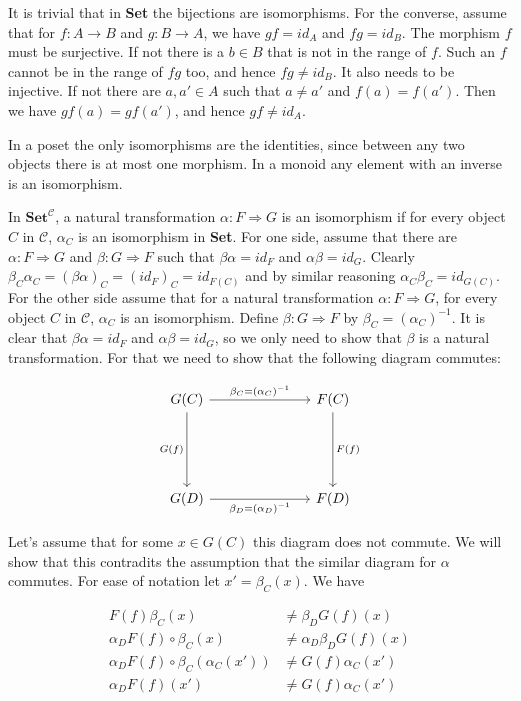 It is trivial that in \textbf{Set} the bijections are isomorphisms. For the converse, assume that for $f:A\to B$ and $g:B\to A$, we have $gf=id_A$ and $fg=id_B$. The morphism $f$ must be surjective. If not there is a $b\in B$ that is not in the range of $f$. Such an $f$ cannot be in the range of $fg$ too, and hence $fg\neq id_B$. It also needs to be injective. If not there are $a,a'\in A$ such that $a\neq a'$ and $f(a)=f(a')$. Then we have $gf(a)=gf(a')$, and hence $gf\neq id_A$.

In a poset the only isomorphisms are the identities, since between any two objects there is at most one morphism. In a monoid any element with an inverse is an isomorphism.

In $\textbf{Set}^\mathcal{C}$, a natural transformation $\alpha:F\Rightarrow G$ is an isomorphism if for every object $C$ in $\mathcal{C}$, $\alpha_C$ is an isomorphism in \textbf{Set}. For one side, assume that there are $\alpha:F\Rightarrow G$ and $\beta:G\Rightarrow F$ such that $\beta\alpha=id_F$ and $\alpha\beta=id_G$. Clearly $\beta_C\alpha_C=(\beta\alpha)_C=(id_F)_C=id_{F(C)}$ and by similar reasoning $\alpha_C\beta_C=id_{G(C)}$. For the other side assume that for a natural transformation $\alpha:F\Rightarrow G$, for every object $C$ in $\mathcal{C}$, $\alpha_C$ is an isomorphism. Define $\beta:G\Rightarrow F$ by $\beta_C=(\alpha_C)^{-1}$. It is clear that $\beta\alpha=id_F$ and $\alpha\beta=id_G$, so we only need to show that $\beta$ is a natural transformation.
For that we need to show that the following diagram commutes:

\[\begin{tikzcd}
	{G(C)} &&& {F(C)} \\
	\\
	\\
	{G(D)} &&& {F(D)}
	\arrow["{\beta_C=(\alpha_C)^{-1}}", from=1-1, to=1-4]
	\arrow["{F(f)}", from=1-4, to=4-4]
	\arrow["{G(f)}"', from=1-1, to=4-1]
	\arrow["{\beta_D=(\alpha_D)^{-1}}"', from=4-1, to=4-4]
\end{tikzcd}\]

Let's assume that for some $x\in G(C)$ this diagram does not commute. We will show that this contradits the assumption that the similar diagram for $\alpha$ commutes. For ease of notation let $x'=\beta_C(x)$. We have

\begin{align*}
F(f)\beta_C(x)&\neq\beta_DG(f)(x)\\
\alpha_DF(f)\circ\beta_C(x)&\neq\alpha_D\beta_DG(f)(x)\\
\alpha_DF(f)\circ\beta_C(\alpha_C(x'))&\neq G(f)\alpha_C(x')\\
\alpha_DF(f)(x')&\neq G(f)\alpha_C(x')
\end{align*}
